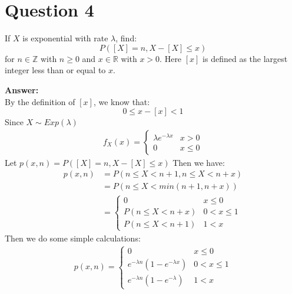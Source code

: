 \documentclass[hidelinks]{article}
\begin{document}
\section{Question 4}
 If $X$ is exponential with rate $\lambda$, find:
 \begin{equation*}
     P([X] = n, X - [X] \leq x)
 \end{equation*}
 for $n \in \mathbb{Z} $ with $n \geq 0$ and $x \in \mathbb{R}$ with $x > 0$. Here $[x]$ is defined as the largest integer less than or equal to $x$.
 
\textbf{Answer:}\\
By the definition of $[x]$, we know that:
$$ 0 \leq x - [x] < 1 $$
Since $X \sim Exp(\lambda)$
\begin{align*}
    f_X(x) = 
    \begin{cases}
        \lambda e^{-\lambda x} & x > 0 \\
        0 & x \leq 0
    \end{cases}
\end{align*}
Let $p(x,n) = P([X] = n, X - [X] \leq x)$
Then we have:
\begin{align*}
    p(x,n) &= P(n \leq X < n+1, n \leq X < n+x) \\
           &= P(n \leq X < min(n+1,n+x))  \\
           &=
           \begin{cases}
           0    & x \leq 0 \\
           P(n \leq X < n+x)    & 0 < x \leq 1 \\
           P(n \leq X < n+1)    & 1 < x
           \end{cases}
\end{align*}
Then we do some simple calculations:
\begin{align*}
    p(x,n) = 
    \begin{cases}
           0    & x \leq 0 \\
           e^{-\lambda n}(1 - e^{-\lambda x})    & 0 < x \leq 1 \\
           e^{-\lambda n}(1 - e^{-\lambda})    & 1 < x
           \end{cases}
\end{align*}
\end{document}
